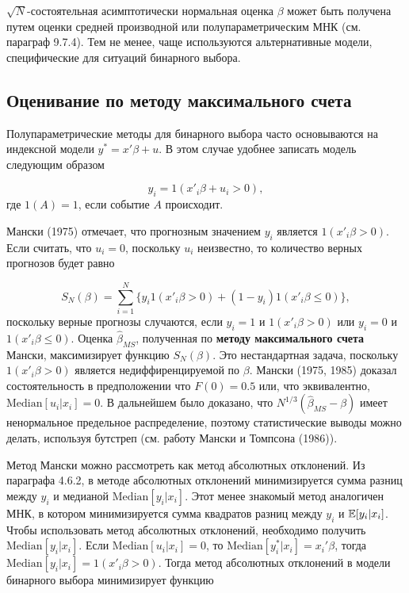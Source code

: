 $\sqrt{N}$-состоятельная асимптотически нормальная оценка $\beta$ может быть получена путем оценки средней производной  или полупараметрическим МНК (см. параграф 9.7.4). Тем не менее,  чаще используются альтернативные модели,  специфические для ситуаций бинарного выбора.

\subsection{Оценивание по методу максимального счета}

Полупараметрические методы для бинарного выбора часто основываются на индексной модели $y^*=x'\beta + u$. В этом случае удобнее записать модель следующим образом 

\[
y_i = 1(x'_i\beta + u_i > 0), 
\] 
где $1(A)=1$,  если событие $A$ происходит.

Мански  (1975)  отмечает,  что прогнозным значением $y_i$ является $1(x'_i\beta >0)$. Если считать, что $u_i=0$,  поскольку $u_i$ неизвестно,  то количество  верных прогнозов будет равно

\begin{equation} 
\label{GrindEQ__14_29_} 
S_N(\beta)=\sum^N_{i=1} \{y_i 1(x'_i\beta > 0) + (1-y_i) 1(x'_i\beta \le 0)\},  
\end{equation} 
поскольку верные прогнозы случаются, если $y_i=1$ и $1(x'_i\beta >0)$ или $y_i=0$ и $1(x'_i\beta \le 0).$ Оценка $\widehat\beta_{MS}$, полученная по \textbf{методу максимального счета} Мански,  максимизирует функцию $S_N(\beta)$. Это нестандартная задача,  поскольку $1(x'_i\beta > 0)$ является недиффиренцируемой по $\beta.$ Мански (1975,  1985) доказал состоятельность в предположении что $F(0) = 0.5$ или,  что эквивалентно,  $\mathrm{Median}[u_i|x_i]=0.$ В дальнейшем было доказано,  что $N^{1/3}(\widehat\beta_{MS} - \beta)$ имеет ненормальное предельное распределение,  поэтому статистические выводы можно делать,  используя бутстреп (см. работу Мански и Томпсона (1986)).

Метод Мански можно рассмотреть как метод абсолютных отклонений. Из параграфа 4.6.2,  в методе абсолютных отклонений минимизируется сумма разниц между $y_i$ и медианой $\mathrm{Median}[y_i|x_i]$. Этот менее знакомый метод аналогичен МНК,  в котором минимизируется сумма квадратов разниц между $y_i$ и $\mathbb{E}[y_i|x_i]$. %
Чтобы использовать метод абсолютных отклонений,  необходимо получить $\mathrm{Median}[y_i|x_i]$. Если $\mathrm{Median}[u_i|x_i] = 0$,  то $\mathrm{Median}[y^*_i|x_i] = x_i'\beta$, тогда $\mathrm{Median}[y_i|x_i] = 1(x'_i\beta > 0).$ Тогда метод абсолютных отклонений в модели бинарного выбора минимизирует функцию 

